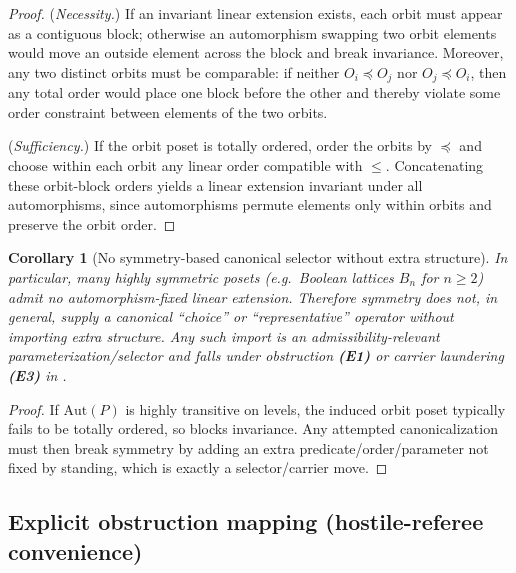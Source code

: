 \documentclass[11pt]{article}
\newtheorem{corollary}[theorem]{Corollary}
\theoremstyle{definition}
\begin{document}
\begin{proof}
(\emph{Necessity.}) If an invariant linear extension exists, each orbit must appear as a contiguous block; otherwise an automorphism swapping two orbit elements would move an outside element across the block and break invariance.
Moreover, any two distinct orbits must be comparable: if neither $O_i\preceq O_j$ nor $O_j\preceq O_i$, then any total order would place one block before the other and thereby violate some order constraint between elements of the two orbits.

(\emph{Sufficiency.}) If the orbit poset is totally ordered, order the orbits by $\preceq$ and choose within each orbit any linear order compatible with $\le$.
Concatenating these orbit-block orders yields a linear extension invariant under all automorphisms, since automorphisms permute elements only within orbits and preserve the orbit order.
\end{proof}

\begin{corollary}[No symmetry-based canonical selector without extra structure]
\label{cor:no-symmetry-selector}
In particular, many highly symmetric posets (e.g.\ Boolean lattices $B_n$ for $n\ge 2$) admit \emph{no} automorphism-fixed linear extension.
Therefore symmetry does not, in general, supply a canonical ``choice'' or ``representative'' operator without importing extra structure.
Any such import is an admissibility-relevant parameterization/selector and falls under obstruction \textbf{(E1)} or carrier laundering \textbf{(E3)} in .
\end{corollary}

\begin{proof}
If $\mathrm{Aut}(P)$ is highly transitive on levels, the induced orbit poset typically fails to be totally ordered, so  blocks invariance.
Any attempted canonicalization must then break symmetry by adding an extra predicate/order/parameter not fixed by standing, which is exactly a selector/carrier move.
\end{proof}

\subsection{Explicit obstruction mapping (hostile-referee convenience)}
\end{document}
